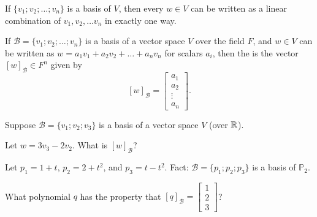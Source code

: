 

{}  If $\{v_1; v_2; \ldots ; v_n\}$ is a basis of $V$, then every $w\in V$
can be written as a linear combination of $v_1, v_2, \ldots v_n$ in exactly one way.  


{} If  $\mathcal{B} = \{v_1; v_2; \ldots ; v_n\}$ is a basis of a vector space $V$ over the field $F$, and 
$w\in V$ can be written as $w = a_1v_1 + a_2v_2 + \ldots + a_n v_n$ for scalars $a_i$, then 
the {} is the vector $[w]_{\mathcal{B}} \in F^n$
given by 
\[ [w]_{\mathcal{B}} = \left[ \begin{array}{c} a_1 \\ a_2 \\ \vdots \\ a_n \end{array} \right]. \]

\endedxtext




\endedxvertical





Suppose $\mathcal{B} = \{v_1; v_2; v_3\}$ is a basis of a vector space $V$ (over $\mathbb R$).  

Let $w = 3v_3 - 2v_2$.  What is $[w]_{\mathcal{B}}$?  







\endedxproblem




Let $p_1 = 1+t$, $p_2 = 2+t^2$, and $p_3 = t-t^2$.  Fact: $\mathcal{B} = \{p_1; p_2; p_3\}$ is a basis of  $\mathbb{P}_2$.  

What polynomial $q$ has the property that  $[q]_{\mathcal{B}} = \left[\begin{array}{c} 1 \\ 2  \\ 3 \end{array} \right]$?

